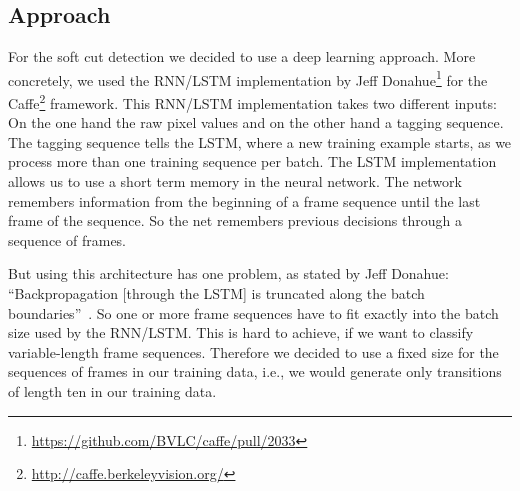 \subsection{Approach}
\label{sec:soft_cut_approach}

For the soft cut detection we decided to use a deep learning approach.
More concretely, we used the RNN/LSTM implementation by Jeff Donahue\footnote{\url{https://github.com/BVLC/caffe/pull/2033}} for the Caffe\footnote{\url{http://caffe.berkeleyvision.org/}} framework.
This RNN/LSTM implementation takes two different inputs: On the one hand the raw pixel values and on the other hand a tagging sequence.
The tagging sequence tells the LSTM, where a new training example starts, as we process more than one training sequence per batch.
The LSTM implementation allows us to use a short term memory in the neural network.
The network remembers information from the beginning of a frame sequence until the last frame of the sequence.
So the net remembers previous decisions through a sequence of frames.

But using this architecture has one problem, as stated by Jeff Donahue: ``Backpropagation [through the LSTM] is truncated along the batch boundaries''~\cite{SequencesInCaffe}.
So one or more frame sequences have to fit exactly into the batch size used by the RNN/LSTM.
This is hard to achieve, if we want to classify variable-length frame sequences.
Therefore we decided to use a fixed size for the sequences of frames in our training data, i.e., we would generate only transitions of length ten in our training data.

